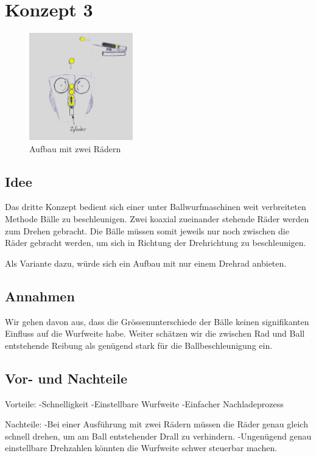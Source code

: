 \section{Konzept 3}
\begin{figure}[h!]
	\centering
	\includegraphics[width=0.4\textwidth]{../../fig/Wurfmaschine_Drehraeder.png}
	\caption{Aufbau mit zwei Rädern}
	\label{fig:drehradmaschine}
\end{figure}

\subsection{Idee}
Das dritte Konzept bedient sich einer unter Ballwurfmaschinen weit verbreiteten Methode Bälle zu beschleunigen. Zwei koaxial zueinander stehende Räder werden zum Drehen gebracht. Die Bälle müssen somit jeweils nur noch zwischen die Räder gebracht werden, um sich in Richtung der Drehrichtung zu beschleunigen.  

Als Variante dazu, würde sich ein Aufbau mit nur einem Drehrad anbieten.


\subsection{Annahmen}
Wir gehen davon aus,  dass die Grössenunterschiede der Bälle keinen signifikanten Einfluss auf die Wurfweite habe. Weiter schätzen wir die zwischen Rad und Ball entstehende Reibung als genügend stark für die Ballbeschleunigung ein.

\subsection{Vor- und Nachteile}
Vorteile:
-Schnelligkeit
-Einstellbare Wurfweite
-Einfacher Nachladeprozess

Nachteile:
-Bei einer Ausführung mit zwei Rädern müssen die Räder genau gleich schnell drehen, um am Ball entstehender Drall zu verhindern.
-Ungenügend genau einstellbare Drehzahlen könnten die Wurfweite schwer steuerbar machen. 
